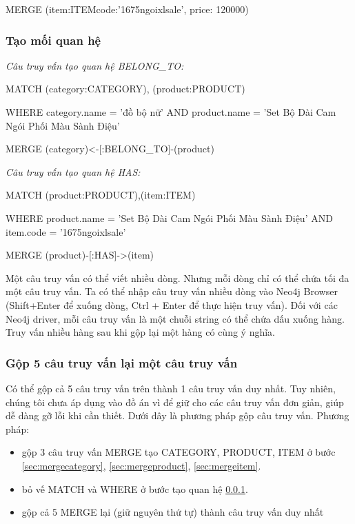 MERGE (item:ITEM{code:'1675ngoixlsale', price: 120000})

\subsubsection{Tạo mối quan hệ}\label{sec:mergerel}

\textit{Câu truy vấn tạo quan hệ BELONG\_TO:} 

\medskip

MATCH (category:CATEGORY), (product:PRODUCT) 

WHERE category.name = 'đồ bộ nữ' AND product.name = 'Set Bộ Dài Cam Ngói Phối Màu Sành Điệu'

MERGE (category)<-[:BELONG\_TO]-(product)

\bigskip

\textit{Câu truy vấn tạo quan hệ HAS:}

\medskip

MATCH (product:PRODUCT),(item:ITEM) 

WHERE  product.name = 'Set Bộ Dài Cam Ngói Phối Màu Sành Điệu' AND item.code = '1675ngoixlsale' 

MERGE (product)-[:HAS]->(item)

\bigskip

Một câu truy vấn có thể viết nhiều dòng. Nhưng mỗi dòng chỉ có thể chứa tối đa một câu truy vấn. Ta có thể nhập câu truy vấn nhiều dòng vào Neo4j Browser (Shift+Enter để xuống dòng, Ctrl + Enter để thực hiện truy vấn). Đối với các Neo4j driver, mỗi câu truy vấn là một chuỗi string có thể chứa dấu xuống hàng. Truy vấn nhiều hàng sau khi gộp lại một hàng có cùng ý nghĩa. 

\subsubsection{Gộp 5 câu truy vấn lại một câu truy vấn}
Có thể gộp cả 5 câu truy vấn trên thành 1 câu truy vấn duy nhất. Tuy nhiên, chúng tôi chưa áp dụng vào đồ án vì để giữ cho các câu truy vấn đơn giản, giúp dễ dàng gỡ lỗi khi cần thiết. Dưới đây là phương pháp gộp câu truy vấn. Phương pháp: 

\begin{itemize}
\item gộp 3 câu truy vấn MERGE tạo CATEGORY, PRODUCT, ITEM ở bước \ref{sec:mergecategory}, \ref{sec:mergeproduct}, \ref{sec:mergeitem}. 
\item bỏ vế MATCH và WHERE ở bước tạo quan hệ \ref{sec:mergerel}. 
\item gộp cả 5 MERGE lại (giữ nguyên thứ tự) thành câu truy vấn duy nhất 
\end{itemize} 

